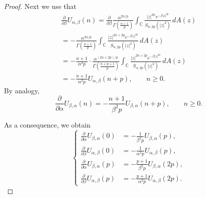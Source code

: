 \documentclass[10pt,a4paper]{amsart}
\begin{document}
\begin{proof}
Next we use that 
\begin{multline}
\frac{\partial}{\partial \beta}U_{\alpha,\beta}(n)=\frac{\partial}{\partial \beta}\frac{ \alpha^{2n/p}}{\Gamma(\frac{n+1}{p})} \int_{\mathbb C}  \frac{  |z|^{2n} e^{-  \beta |z|^{2p}}  }{ S_{\alpha,2p}(|z|^2)}\,dA(z)\\=
-\frac{ \alpha^{2n/p}}{\Gamma(\frac{n+1}{p})} \int_{\mathbb C}  \frac{  |z|^{2n+2p} e^{-  \beta |z|^{2p}}  }{ S_{\alpha,2p}(|z|^2)}\,dA(z)\\=-\frac{n+1}{\alpha^2p}\cdot\frac{ \alpha^{(2n+2p)/p}}{\Gamma(\frac{n+p+1}{p})} \int_{\mathbb C}  \frac{  |z|^{2n+2p} e^{-  \beta |z|^{2p}}  }{ S_{\alpha,2p}(|z|^2)}\,dA(z)\\=-\frac{n+1}{\alpha^2p}U_{\alpha,\beta}(n+p),\qquad n\ge 0.
\label{tt6}
\end{multline}
By analogy,
\begin{equation}
\frac{\partial}{\partial \alpha}U_{\beta,\alpha}(n)=-\frac{n+1}{\beta^2p}U_{\beta,\alpha}(n+p),\qquad n\ge 0.
\label{tt7}
\end{equation}

As a consequence, we obtain 
\begin{equation}
\left\{
\begin{aligned}
\frac{\partial}{\partial \alpha}U_{\beta,\alpha}(0)&=-\frac{1}{\beta^2p}U_{\beta,\alpha}(p),\\
\frac{\partial}{\partial \beta}U_{\alpha,\beta}(0)&=-\frac{1}{\alpha^2p}U_{\alpha,\beta}(p),\\
\frac{\partial}{\partial \alpha}U_{\beta,\alpha}(p)&=-\frac{p+1}{\beta^2p}U_{\beta,\alpha}(2p),\\ 
\frac{\partial}{\partial \beta}U_{\alpha,\beta}(p)&=-\frac{p+1}{\alpha^2p}U_{\alpha,\beta}(2p).
\end{aligned}
\right.
\label{start}
\end{equation}


\end{proof}
\end{document}
